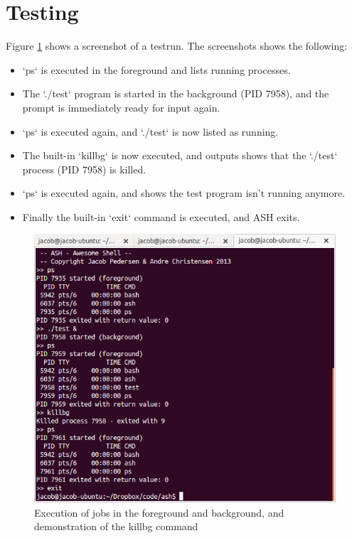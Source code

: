 \documentclass[pdftex, a4paper,12pt]{article}
\begin{document}
\section{Testing}

Figure \ref{fig:1} shows a screenshot of a testrun. The screenshots shows the following:

\begin{itemize}
	\item `ps` is executed in the foreground and lists running processes.
	\item The `./test` program is started in the background (PID 7958), and the prompt is immediately ready for input again.
	\item `ps` is executed again, and `./test` is now listed as running.
	\item The built-in `killbg` is now executed, and outputs shows that the `./test` process (PID 7958) is killed.
	\item `ps` is executed again, and shows the test program isn't running anymore.
	\item Finally the built-in `exit` command is executed, and ASH exits.
\end{itemize}

\begin{figure}[!ht]
	\centering
	\includegraphics[width=1\textwidth]{testing}
	\caption{Execution of jobs in the foreground and background, and demonstration of the killbg command}
	\label{fig:1}
\end{figure}
\end{document}
